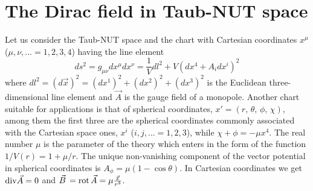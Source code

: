 \documentclass[a4paper,12pt]{article}
\begin{document}
\section{The Dirac field in Taub-NUT space}

Let us consider the Taub-NUT space and the chart with Cartesian coordinates 
$x^{\mu}$  ($\mu, \nu,...=1,2,3,4$) having the line element  
\begin{equation}\label{(met)} 
ds^{2}=g_{\mu\nu}dx^{\mu}dx^{\nu}=\frac{1}{V}dl^{2}+V(dx^{4}+
A_{i}dx^{i})^{2}
\end{equation}   
where $dl^{2}=(d\vec{x})^{2}=(dx^{1})^{2}+(dx^{2})^{2}+(dx^{3})^{2}$
is the  Euclidean three-dimen\-sio\-nal line element and $\vec{A}$ is 
the gauge field of a monopole. Another chart 
suitable for applications is that of spherical coordinates, $x'=
(r,\,\theta,\,\phi,\,\chi)$, among them the first three are the  
spherical coordinates commonly associated with the  Cartesian space 
ones, $x^{i}$  ($i,j,...=1,2,3$), while 
$\chi+\phi=-\mu x^{4}$. The real number $\mu$ is the  parameter of the 
theory which enters in the form of the function $1/V(r)=1+\mu/r$. 
The unique non-vanishing component of the vector potential in 
spherical coordinates is $A_{\phi}=\mu(1-\cos\theta)$. In Cartesian 
coordinates we get  ${\rm div}\vec{A}=0$ and $\vec{B}\,={\rm rot}\, 
\vec{A}=\mu\frac{\vec{x}}{r^3}$.
\end{document}
